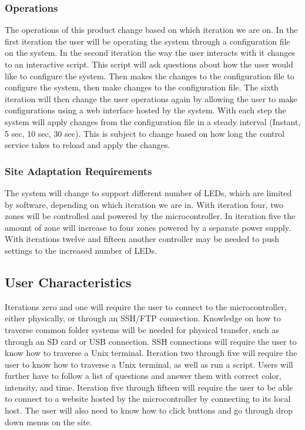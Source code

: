 \documentclass[onecolumn, draftclsnofoot,10pt, compsoc]{IEEEtran}
\begin{document}
			\subsubsection{Operations}
				The operations of this product change based on which iteration we are on. In the first iteration the user will be operating the system through a configuration file on the system. In the second iteration
				the way the user interacts with it changes to an interactive script. This script will ask questions about how the user would like to configure the system. Then makes the changes to the configuration file to configure the system, then make changes to the configuration file.
				The sixth iteration will then change the user operations again by allowing the user to make configurations using a web interface hosted by the system. With each step the system will apply changes from the configuration file in a steady interval (Instant, 5 sec, 10 sec, 30 sec). This is subject to change based on how long the control service takes to reload and apply the changes.
			\subsubsection{Site Adaptation Requirements}
				The system will change to support different number of LEDs, which are limited by software, depending on which iteration we are in. With iteration four, two zones will be controlled and powered by the microcontroller.
				In iteration five the amount of zone will increase to four zones powered by a separate power supply. With iterations twelve and fifteen another controller may be needed to push settings to the increased number of LEDs.


		\subsection{User Characteristics}
		Iterations zero and one will require the user to connect to the microcontroller, either physically, or through an SSH/FTP connection. Knowledge on how to traverse common folder systems will be needed for physical transfer, such as
		through an SD card or USB connection. SSH connections will require the user to know how to traverse a Unix terminal.
		Iteration two through five will require the user to know how to traverse a Unix terminal, as well as run a script. Users will further have to follow a list of questions and answer them with correct color, intensity, and time.
		Iteration five through fifteen will require the user to be able to connect to a website hosted by the microcontroller by connecting to its local host. The user will also need to know how to click buttons and go through drop down menus on the site.
\end{document}
